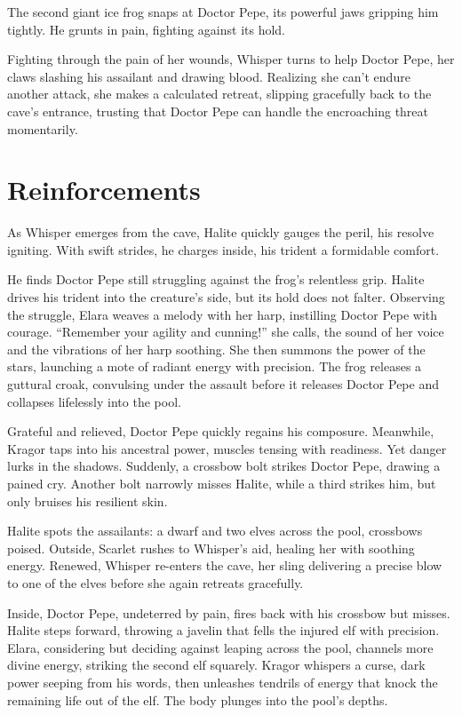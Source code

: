 \documentclass[
  letterpaper,12pt,twoside,twocolumn,openany,
  nodeprecatedcode,bg=full]{dndbook}
\begin{document}
The second giant ice frog snaps at Doctor Pepe, its powerful jaws
gripping him tightly. He grunts in pain, fighting against its hold.

Fighting through the pain of her wounds, Whisper turns to help Doctor
Pepe, her claws slashing his assailant and drawing blood. Realizing she
can't endure another attack, she makes a calculated retreat, slipping
gracefully back to the cave's entrance, trusting that Doctor Pepe can
handle the encroaching threat momentarily.

\section{Reinforcements}\label{reinforcements}

As Whisper emerges from the cave, Halite quickly gauges the peril, his
resolve igniting. With swift strides, he charges inside, his trident a
formidable comfort.

He finds Doctor Pepe still struggling against the frog's relentless
grip. Halite drives his trident into the creature's side, but its hold
does not falter. Observing the struggle, Elara weaves a melody with her
harp, instilling Doctor Pepe with courage. ``Remember your agility and
cunning!'' she calls, the sound of her voice and the vibrations of her
harp soothing. She then summons the power of the stars, launching a mote
of radiant energy with precision. The frog releases a guttural croak,
convulsing under the assault before it releases Doctor Pepe and
collapses lifelessly into the pool.

Grateful and relieved, Doctor Pepe quickly regains his composure.
Meanwhile, Kragor taps into his ancestral power, muscles tensing with
readiness. Yet danger lurks in the shadows. Suddenly, a crossbow bolt
strikes Doctor Pepe, drawing a pained cry. Another bolt narrowly misses
Halite, while a third strikes him, but only bruises his resilient skin.

Halite spots the assailants: a dwarf and two elves across the pool,
crossbows poised. Outside, Scarlet rushes to Whisper's aid, healing her
with soothing energy. Renewed, Whisper re-enters the cave, her sling
delivering a precise blow to one of the elves before she again retreats
gracefully.

Inside, Doctor Pepe, undeterred by pain, fires back with his crossbow
but misses. Halite steps forward, throwing a javelin that fells the
injured elf with precision. Elara, considering but deciding against
leaping across the pool, channels more divine energy, striking the
second elf squarely. Kragor whispers a curse, dark power seeping from
his words, then unleashes tendrils of energy that knock the remaining
life out of the elf. The body plunges into the pool's depths.
\end{document}
